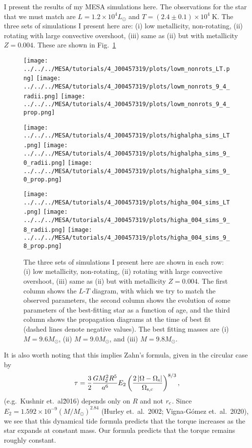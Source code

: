 \documentclass[11pt,
        usenames, %
        dvipsnames %
    ]{article}
\newcommand*{\abs}[1]{\left|#1\right|}
\newcommand*{\p}[1]{\left(#1\right)}
\begin{document}
I present the results of my MESA simulations here. The observations for the star
that we must match are $L = 1.2 \times 10^4 L_{\odot}$ and $T = (2.4 \pm 0.1)
\times 10^4\;\mathrm{K}$. The three sets of simulations I present here are: (i)
low metallicity, non-rotating, (ii) rotating with large convective overshoot,
(iii) same as (ii) but with metallicity $Z = 0.004$. These are shown in
Fig.~\ref{fig:2}
\begin{figure}
    \centering
    \texttt{[image: ../../../MESA/tutorials/4\_J00457319/plots/lowm\_nonrots\_LT.png]}
    \texttt{[image: ../../../MESA/tutorials/4\_J00457319/plots/lowm\_nonrots\_9\_4\_radii.png]}
    \texttt{[image: ../../../MESA/tutorials/4\_J00457319/plots/lowm\_nonrots\_9\_4\_prop.png]}

    \texttt{[image: ../../../MESA/tutorials/4\_J00457319/plots/highalpha\_sims\_LT.png]}
    \texttt{[image: ../../../MESA/tutorials/4\_J00457319/plots/highalpha\_sims\_9\_0\_radii.png]}
    \texttt{[image: ../../../MESA/tutorials/4\_J00457319/plots/highalpha\_sims\_9\_0\_prop.png]}

    \texttt{[image: ../../../MESA/tutorials/4\_J00457319/plots/higha\_004\_sims\_LT.png]}
    \texttt{[image: ../../../MESA/tutorials/4\_J00457319/plots/higha\_004\_sims\_9\_8\_radii.png]}
    \texttt{[image: ../../../MESA/tutorials/4\_J00457319/plots/higha\_004\_sims\_9\_8\_prop.png]}
    \caption{The three sets of simulations I present here are shown in each row:
    (i) low metallicity, non-rotating, (ii) rotating with large convective
    overshoot, (iii) same as (ii) but with metallicity $Z = 0.004$. The first
    column shows the $L$-$T$ diagram, with which we try to match the observed
    parameters, the second column shows the evolution of some parameters of the
    best-fitting star as a function of age, and the third column shows the
    propagation diagrams at the time of best fit (dashed lines denote negative
    values). The best fitting masses are (i) $M = 9.6M_{\odot}$, (ii) $M =
    9.0M_{\odot}$, and (iii) $M = 9.8M_{\odot}$. }\label{fig:2}
\end{figure}

It is also worth noting that this implies Zahn's formula, given in the circular
case by
\begin{equation}
    \tau = \frac{3}{2}\frac{GM_2^2R^5}{a^6}E_2 \p{\frac{2\abs{\Omega -
        \Omega_{\rm s}}}{\Omega_{\rm s, c}}}^{8/3},
\end{equation}
(e.g.\ Kushnir et.\ al\. 2016) depends only on $R$ and not $r_{\rm c}$. Since
$E_2 = 1.592 \times 10^{-9}\p{M / M_{\odot}}^{2.84}$ (Hurley et.\ al.\ 2002;
Vigna-G\'omez et.\ al.\ 2020), we see that this dynamical tide formula predicts
that the torque increases as the star expands at constant mass. Our formula
predicts that the torque remains roughly constant.
\end{document}
